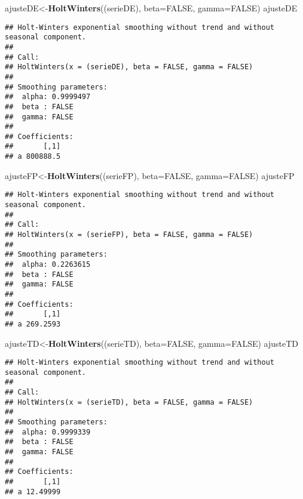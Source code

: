 \documentclass[]{article}
\newenvironment{Shaded}{\begin{snugshade}}{\end{snugshade}}
\newcommand{\DataTypeTok}[1]{\textcolor[rgb]{0.13,0.29,0.53}{#1}}
\newcommand{\KeywordTok}[1]{\textcolor[rgb]{0.13,0.29,0.53}{\textbf{#1}}}
\newcommand{\NormalTok}[1]{#1}
\newcommand{\OtherTok}[1]{\textcolor[rgb]{0.56,0.35,0.01}{#1}}
\begin{document}
\begin{Shaded}
\begin{Highlighting}[]
\NormalTok{ajusteDE<-}\KeywordTok{HoltWinters}\NormalTok{((serieDE), }\DataTypeTok{beta=}\OtherTok{FALSE}\NormalTok{, }\DataTypeTok{gamma=}\OtherTok{FALSE}\NormalTok{)}
\NormalTok{ajusteDE}
\end{Highlighting}
\end{Shaded}

\begin{verbatim}
## Holt-Winters exponential smoothing without trend and without seasonal component.
## 
## Call:
## HoltWinters(x = (serieDE), beta = FALSE, gamma = FALSE)
## 
## Smoothing parameters:
##  alpha: 0.9999497
##  beta : FALSE
##  gamma: FALSE
## 
## Coefficients:
##       [,1]
## a 800888.5
\end{verbatim}

\begin{Shaded}
\begin{Highlighting}[]
\NormalTok{ajusteFP<-}\KeywordTok{HoltWinters}\NormalTok{((serieFP), }\DataTypeTok{beta=}\OtherTok{FALSE}\NormalTok{, }\DataTypeTok{gamma=}\OtherTok{FALSE}\NormalTok{)}
\NormalTok{ajusteFP}
\end{Highlighting}
\end{Shaded}

\begin{verbatim}
## Holt-Winters exponential smoothing without trend and without seasonal component.
## 
## Call:
## HoltWinters(x = (serieFP), beta = FALSE, gamma = FALSE)
## 
## Smoothing parameters:
##  alpha: 0.2263615
##  beta : FALSE
##  gamma: FALSE
## 
## Coefficients:
##       [,1]
## a 269.2593
\end{verbatim}

\begin{Shaded}
\begin{Highlighting}[]
\NormalTok{ajusteTD<-}\KeywordTok{HoltWinters}\NormalTok{((serieTD), }\DataTypeTok{beta=}\OtherTok{FALSE}\NormalTok{, }\DataTypeTok{gamma=}\OtherTok{FALSE}\NormalTok{)}
\NormalTok{ajusteTD}
\end{Highlighting}
\end{Shaded}

\begin{verbatim}
## Holt-Winters exponential smoothing without trend and without seasonal component.
## 
## Call:
## HoltWinters(x = (serieTD), beta = FALSE, gamma = FALSE)
## 
## Smoothing parameters:
##  alpha: 0.9999339
##  beta : FALSE
##  gamma: FALSE
## 
## Coefficients:
##       [,1]
## a 12.49999
\end{verbatim}
\end{document}
